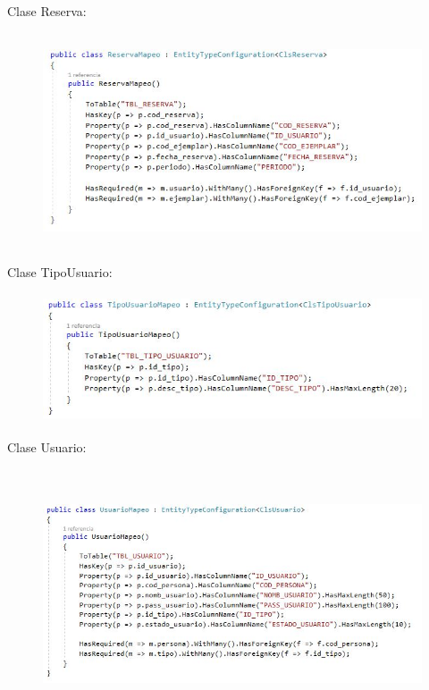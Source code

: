 \documentclass[12pt]{article}
\begin{document}
\begin{enumerate}[label*=\arabic*.]
\begin{enumerate}[label*=\arabic*.]
\newpage
Clase Reserva:
\begin{figure}[H]
	\begin{Center}
		\includegraphics[width=5.91in,height=2.50in]{./media/reservaMap.jpg}
	\end{Center}
\end{figure}


Clase TipoUsuario:
\begin{figure}[H]
	\begin{Center}
		\includegraphics[width=5.91in,height=1.50in]{./media/TusuarioMap.jpg}
	\end{Center}
\end{figure}


Clase Usuario:
\begin{figure}[H]
	\begin{Center}
		\includegraphics[width=5.91in,height=2.90in]{./media/usuarioMap.jpg}
	\end{Center}
\end{figure}

\end{enumerate}
\end{enumerate}\par


\vspace{\baselineskip}

\vspace{\baselineskip}

\vspace{\baselineskip}

\vspace{\baselineskip}

\printbibliography
\end{document}
